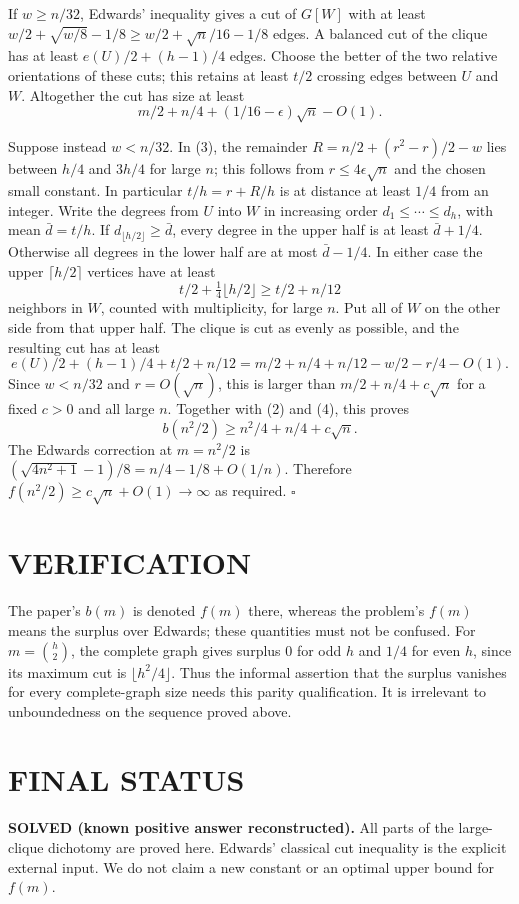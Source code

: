 If $w\ge n/32$, Edwards' inequality gives a cut of $G[W]$ with at least
$w/2+\sqrt{w/8}-1/8\ge w/2+\sqrt n/16-1/8$ edges. A balanced cut
of the clique has at least $e(U)/2+(h-1)/4$ edges. Choose the better
of the two relative orientations of these cuts; this retains at least
$t/2$ crossing edges between $U$ and $W$. Altogether the cut has size
at least
\[
 m/2+n/4+(1/16-\epsilon)\sqrt n-O(1).                    \tag{4}
\]

Suppose instead $w<n/32$. In (3), the remainder
$R=n/2+(r^2-r)/2-w$ lies between $h/4$ and $3h/4$ for large $n$;
this follows from $r\le4\epsilon\sqrt n$ and the chosen small constant.
In particular $t/h=r+R/h$ is at distance at least $1/4$ from an integer.
Write the degrees from $U$ into $W$ in increasing order
$d_1\le\cdots\le d_h$, with mean $\bar d=t/h$. If
$d_{\lfloor h/2\rfloor}\ge\bar d$, every degree in the upper half
is at least $\bar d+1/4$. Otherwise all degrees in the lower half are
at most $\bar d-1/4$. In either case the upper $\lceil h/2\rceil$
vertices have at least
\[
 t/2+\tfrac14\lfloor h/2\rfloor\ge t/2+n/12
\]
neighbors in $W$, counted with multiplicity, for large $n$.
Put all of $W$ on the other side from that upper half. The clique is
cut as evenly as possible, and the resulting cut has at least
\[
 e(U)/2+(h-1)/4+t/2+n/12
 =m/2+n/4+n/12-w/2-r/4-O(1).
\]
Since $w<n/32$ and $r=O(\sqrt n)$, this is larger than
$m/2+n/4+c\sqrt n$ for a fixed $c>0$ and all large $n$.
Together with (2) and (4), this proves
\[
 b(n^2/2)\ge n^2/4+n/4+c\sqrt n.
\]
The Edwards correction at $m=n^2/2$ is
$(\sqrt{4n^2+1}-1)/8=n/4-1/8+O(1/n)$. Therefore
$f(n^2/2)\ge c\sqrt n+O(1)\to\infty$ as required.
\hfill$\square$

\section{VERIFICATION}
The paper's $b(m)$ is denoted $f(m)$ there, whereas the problem's $f(m)$
means the surplus over Edwards; these quantities must not be confused.
For $m=\binom h2$, the complete graph gives surplus $0$ for odd $h$ and
$1/4$ for even $h$, since its maximum cut is $\lfloor h^2/4\rfloor$.
Thus the informal assertion that the surplus vanishes for every
complete-graph size needs this parity qualification. It is irrelevant
to unboundedness on the sequence proved above.

\section{FINAL STATUS}
\textbf{SOLVED (known positive answer reconstructed).}
All parts of the large-clique dichotomy are proved here. Edwards'
classical cut inequality is the explicit external input. We do not
claim a new constant or an optimal upper bound for $f(m)$.

